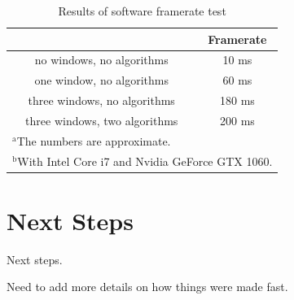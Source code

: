 \documentclass[conference]{IEEEtran}
\begin{document}
\begin{table}[htbp]
    \caption{Results of software framerate test}
    \begin{center}
    \begin{tabular}{|c|c|}
    \hline
     & \textbf{Framerate} \\
    \hline
    no windows, no algorithms & 10 ms \\
    \hline
    one window, no algorithms & 60 ms \\
    \hline
    three windows, no algorithms & 180 ms \\
    \hline
    three windows, two algorithms & 200 ms \\
    \hline
    \multicolumn{2}{l}{$^{\mathrm{a}}$The numbers are approximate.} \\
    \multicolumn{2}{l}{$^{\mathrm{b}}$With Intel Core i7 and Nvidia GeForce GTX 1060.}
    \end{tabular}
    \label{Software framerates}
    \end{center}
\end{table}

\section{Next Steps}
Next steps.

Need to add more details on how things were made fast.
\end{document}
